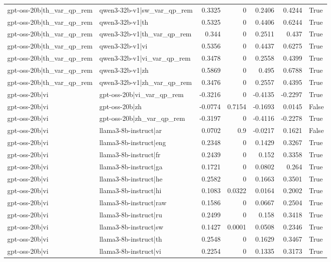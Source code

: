 \begin{table}
\begin{tabular}{l l r r r r l}
gpt-oss-20b|th_var_qp_rem & qwen3-32b-v1|sw_var_qp_rem & 0.3325 & 0 & 0.2406 & 0.4244 & True \\
gpt-oss-20b|th_var_qp_rem & qwen3-32b-v1|th & 0.5325 & 0 & 0.4406 & 0.6244 & True \\
gpt-oss-20b|th_var_qp_rem & qwen3-32b-v1|th_var_qp_rem & 0.344 & 0 & 0.2511 & 0.437 & True \\
gpt-oss-20b|th_var_qp_rem & qwen3-32b-v1|vi & 0.5356 & 0 & 0.4437 & 0.6275 & True \\
gpt-oss-20b|th_var_qp_rem & qwen3-32b-v1|vi_var_qp_rem & 0.3478 & 0 & 0.2558 & 0.4399 & True \\
gpt-oss-20b|th_var_qp_rem & qwen3-32b-v1|zh & 0.5869 & 0 & 0.495 & 0.6788 & True \\
gpt-oss-20b|th_var_qp_rem & qwen3-32b-v1|zh_var_qp_rem & 0.3476 & 0 & 0.2557 & 0.4395 & True \\
gpt-oss-20b|vi & gpt-oss-20b|vi_var_qp_rem & -0.3216 & 0 & -0.4135 & -0.2297 & True \\
gpt-oss-20b|vi & gpt-oss-20b|zh & -0.0774 & 0.7154 & -0.1693 & 0.0145 & False \\
gpt-oss-20b|vi & gpt-oss-20b|zh_var_qp_rem & -0.3197 & 0 & -0.4116 & -0.2278 & True \\
gpt-oss-20b|vi & llama3-8b-instruct|ar & 0.0702 & 0.9 & -0.0217 & 0.1621 & False \\
gpt-oss-20b|vi & llama3-8b-instruct|eng & 0.2348 & 0 & 0.1429 & 0.3267 & True \\
gpt-oss-20b|vi & llama3-8b-instruct|fr & 0.2439 & 0 & 0.152 & 0.3358 & True \\
gpt-oss-20b|vi & llama3-8b-instruct|ga & 0.1721 & 0 & 0.0802 & 0.264 & True \\
gpt-oss-20b|vi & llama3-8b-instruct|he & 0.2582 & 0 & 0.1663 & 0.3501 & True \\
gpt-oss-20b|vi & llama3-8b-instruct|hi & 0.1083 & 0.0322 & 0.0164 & 0.2002 & True \\
gpt-oss-20b|vi & llama3-8b-instruct|raw & 0.1586 & 0 & 0.0667 & 0.2504 & True \\
gpt-oss-20b|vi & llama3-8b-instruct|ru & 0.2499 & 0 & 0.158 & 0.3418 & True \\
gpt-oss-20b|vi & llama3-8b-instruct|sw & 0.1427 & 0.0001 & 0.0508 & 0.2346 & True \\
gpt-oss-20b|vi & llama3-8b-instruct|th & 0.2548 & 0 & 0.1629 & 0.3467 & True \\
gpt-oss-20b|vi & llama3-8b-instruct|vi & 0.2254 & 0 & 0.1335 & 0.3173 & True \\

\end{tabular}
\end{table}
